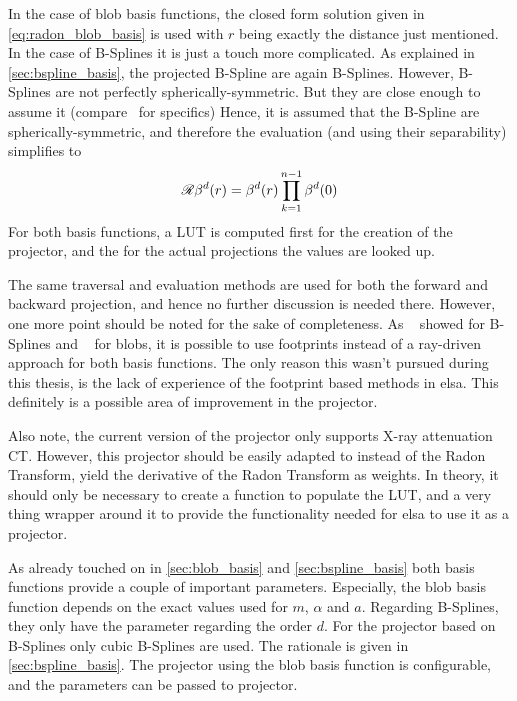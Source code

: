 In the case of blob basis functions, the closed form solution given in \autoref{eq:radon_blob_basis}
is used with \(r\) being exactly the distance just mentioned. In the case of B-Splines it is just a
touch more complicated. As explained in \autoref{sec:bspline_basis}, the projected B-Spline are
again B-Splines. However, B-Splines are not perfectly spherically-symmetric. But they are close
enough to assume it (compare~\cite{momey_b-spline_2012, momey_spline_2015} for specifics) Hence, it
is assumed that the B-Spline are spherically-symmetric, and therefore the evaluation (and using
their separability) simplifies to
\begin{equation}
	\mathscr{R}\beta^d(r) = \beta^d(r) \prod^{n - 1}_{k=1} \beta^d(0)
\end{equation}
For both basis functions, a \gls{LUT} is computed first for the creation of the projector, and the
for the actual projections the values are looked up.

The same traversal and evaluation methods are used for both the forward and backward projection, and
hence no further discussion is needed there. However, one more point should be noted for the sake of
completeness. As \citeauthor*{momey_spline_2015}~\cite{momey_spline_2015} showed for B-Splines and
\citeauthor*{kohler_iterative_2011}~\cite{kohler_iterative_2011} for blobs, it is possible to use
footprints instead of a ray-driven approach for both basis functions. The only reason this wasn't
pursued during this thesis, is the lack of experience of the footprint based methods in elsa. This
definitely is a possible area of improvement in the projector.

Also note, the current version of the projector only supports X-ray attenuation CT\@. However, this
projector should be easily adapted to instead of the Radon Transform, yield the derivative of the
Radon Transform as weights. In theory, it should only be necessary to create a function to populate
the \gls{LUT}, and a very thing wrapper around it to provide the functionality needed for elsa to
use it as a projector.

As already touched on in \autoref{sec:blob_basis} and \autoref{sec:bspline_basis} both basis
functions provide a couple of important parameters. Especially, the blob basis function depends on
the exact values used for \(m\), \(\alpha\) and \(a\). Regarding B-Splines, they only have the
parameter regarding the order \(d\). For the projector based on B-Splines only cubic B-Splines are
used. The rationale is given in \autoref{sec:bspline_basis}. The projector using the blob basis
function is configurable, and the parameters can be passed to projector.

